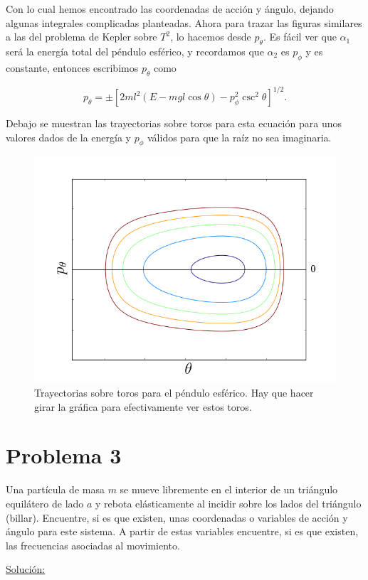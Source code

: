 \documentclass[a4paper,10pt]{article}
\numberwithin{equation}{section}
\begin{document}
Con lo cual hemos encontrado las coordenadas de acción y ángulo, dejando algunas 
integrales complicadas planteadas. Ahora para trazar las figuras similares a las 
del problema de Kepler sobre $T^2$, lo hacemos desde $p_\theta$. Es fácil ver que 
$\alpha_1$ será la energía total del péndulo esférico, y recordamos que $\alpha_2$ 
es $p_\phi$ y es constante, entonces escribimos $p_\theta$ como 

\begin{equation}
 p_\theta = \pm \left[
 2ml^2(E - mgl\cos{\theta}) -  p_\phi^2\csc^2{\theta}\right]^{1/2}.
\end{equation}

Debajo se muestran las trayectorias sobre toros para esta ecuación para unos valores dados 
de la energía y $p_\phi$ válidos para que la raíz no sea imaginaria.

\begin{figure}[H]
 \center 
 \includegraphics[scale=0.4]{problema2fig2}
 \caption{Trayectorias sobre toros para el péndulo esférico. Hay que hacer girar 
 la gráfica para efectivamente ver estos toros.}
 \label{fig:problema2fig2}
\end{figure}


\section{Problema 3}

Una partícula de masa $m$ se mueve libremente en el interior de un triángulo  
equilátero de lado $a$ y rebota elásticamente al incidir sobre los lados del triángulo 
(billar). Encuentre, si es que existen, unas coordenadas o variables de acción 
y ángulo para este sistema. A partir de estas variables encuentre, si es que existen,
las frecuencias asociadas al movimiento. 

\vspace{.3cm}

\underline{Solución:} \vspace{.3cm}
\end{document}
